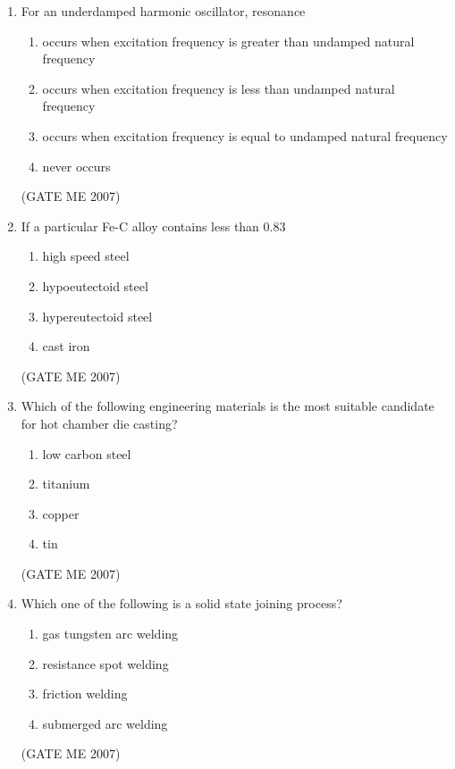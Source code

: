 \documentclass[journal]{IEEEtran}
\begin{document}
\begin{enumerate}
\item For an underdamped harmonic oscillator, resonance
\begin{enumerate}
\item occurs when excitation frequency is greater than undamped natural frequency
\item occurs when excitation frequency is less than undamped natural frequency
\item occurs when excitation frequency is equal to undamped natural frequency
\item never occurs
\end{enumerate}
\hfill (GATE ME 2007)

\item If a particular Fe-C alloy contains less than 0.83%
\begin{multicols}{2}
\begin{enumerate}
\item high speed steel
\item hypoeutectoid steel
\item hypereutectoid steel
\item cast iron
\end{enumerate}
\end{multicols}
\hfill (GATE ME 2007)

\item Which of the following engineering materials is the most suitable candidate for hot chamber die casting?
\begin{multicols}{2}
\begin{enumerate}
\item low carbon steel
\item titanium
\item copper
\item tin
\end{enumerate}
\end{multicols}
\hfill (GATE ME 2007)

\item Which one of the following is a solid state joining process?
\begin{multicols}{2}
\begin{enumerate}
\item gas tungsten arc welding
\item resistance spot welding
\item friction welding
\item submerged arc welding
\end{enumerate}
\end{multicols}
\hfill (GATE ME 2007)


\end{enumerate}
\end{document}
